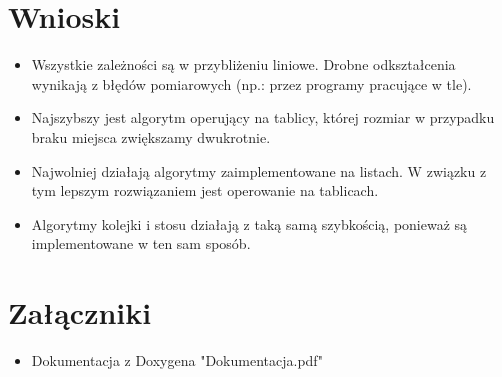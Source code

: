 \documentclass{mwart}
\begin{document}
\section{Wnioski\label{wnioski}}
\begin{itemize}
\item Wszystkie zależności są w przybliżeniu liniowe. Drobne odkształcenia wynikają z błędów pomiarowych (np.: przez programy pracujące w tle).
\item Najszybszy jest algorytm operujący na tablicy, której rozmiar w przypadku braku miejsca zwiększamy dwukrotnie.
\item Najwolniej działają algorytmy zaimplementowane na listach. W związku z tym lepszym rozwiązaniem jest operowanie na tablicach.
\item Algorytmy kolejki i stosu działają z taką samą szybkością, ponieważ są implementowane w ten sam sposób.
\end{itemize}

\section{Załączniki}
\begin{itemize}
\item Dokumentacja z Doxygena "Dokumentacja.pdf"
\end{itemize}
\end{document}
